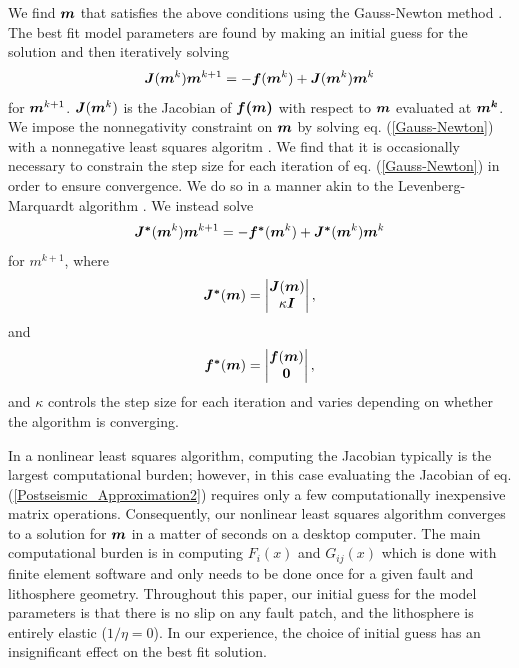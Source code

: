 \documentclass[extra]{gji}
\begin{document}
We find $\mitbf{m}$ that satisfies the above conditions using the
Gauss-Newton method \citep[e.g.][]{A2013}.  The best fit model parameters are
found by making an initial guess for the solution and then iteratively
solving
\begin{equation}\label{Gauss-Newton}
\mitbf{J}(\mitbf{m}^{k})\mitbf{m}^{k+1} = -\mitbf{f}(\mitbf{m}^k) + \mitbf{J}(\mitbf{m}^{k})\mitbf{m}^{k}
\end{equation}
for $\mitbf{m}^{k+1}$.  $\mitbf{J}(\mitbf{m}^k)$ is the Jacobian of
$\mitbf{f(m)}$ with respect to $\mitbf{m}$ evaluated at
$\mitbf{m^k}$. We impose the nonnegativity constraint on $\mitbf{m}$
by solving eq. (\ref{Gauss-Newton}) with a nonnegative least squares
algoritm \citep{LH1974}. We find that it is occasionally necessary to
constrain the step size for each iteration of eq. (\ref{Gauss-Newton})
in order to ensure convergence.  We do so in a manner akin to the
Levenberg-Marquardt algorithm \citep[e.g.][]{A2013}.  We instead solve
\begin{equation}\label{Levenberg-Marquardt}
  \mitbf{J^*}(\mitbf{m}^k)\mitbf{m}^{k+1} = -\mitbf{f^*}(\mitbf{m}^k) + \mitbf{J^*}(\mitbf{m}^k)\mitbf{m}^k
\end{equation}
for $m^{k+1}$, where
\begin{equation}
  \mitbf{J^*}(\mitbf{m}) = 
      \begin{vmatrix}
      \mitbf{J}(\mitbf{m})\\
      \kappa\mitbf{I}
      \end{vmatrix},
\end{equation}
and
\begin{equation}
  \mitbf{f^*}(\mitbf{m}) = 
      \begin{vmatrix}
      \mitbf{f}(\mitbf{m})\\
      \mitbf{0}
      \end{vmatrix},
\end{equation}
and $\kappa$ controls the step size for each iteration and varies
depending on whether the algorithm is converging.  

In a nonlinear least squares algorithm, computing the Jacobian
typically is the largest computational burden; however, in this case
evaluating the Jacobian of eq. (\ref{Postseismic_Approximation2})
requires only a few computationally inexpensive matrix operations.
Consequently, our nonlinear least squares algorithm converges to a
solution for $\mitbf{m}$ in a matter of seconds on a desktop computer.
The main computational burden is in computing $F_i(x)$ and $G_{ij}(x)$
which is done with finite element software and only needs to be done
once for a given fault and lithosphere geometry. Throughout this
paper, our initial guess for the model parameters is that there is no
slip on any fault patch, and the lithosphere is entirely elastic
($1/\eta = 0$).  In our experience, the choice of initial guess has an
insignificant effect on the best fit solution.
\end{document}
